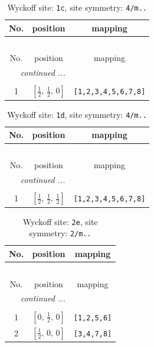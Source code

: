 \documentclass[fleqn,8pt]{jsarticle}
\begin{document}
\begin{longtable}{ccc}
\caption{Wyckoff site: {\tt 1c}, site symmetry: {\tt 4/m..}}
 \\
 \hline \hline
No. & position & mapping \\ \hline \endfirsthead

\multicolumn{2}{l}{\tablename\ \thetable{}} \\
 \hline \hline
No. & position & mapping \\ \hline \endhead

 \hline \hline
\multicolumn{2}{r}{\footnotesize\it continued ...} \\ \endfoot

 \hline \hline
\multicolumn{2}{r}{} \\ \endlastfoot

1 & $\left[ \frac{1}{2},\, \frac{1}{2},\, 0 \right]$ & {\tt [1,2,3,4,5,6,7,8]} \\
\end{longtable}
\renewcommand{\arraystretch}{1.2}
\begin{longtable}{ccc}
\caption{Wyckoff site: {\tt 1d}, site symmetry: {\tt 4/m..}}
 \\
 \hline \hline
No. & position & mapping \\ \hline \endfirsthead

\multicolumn{2}{l}{\tablename\ \thetable{}} \\
 \hline \hline
No. & position & mapping \\ \hline \endhead

 \hline \hline
\multicolumn{2}{r}{\footnotesize\it continued ...} \\ \endfoot

 \hline \hline
\multicolumn{2}{r}{} \\ \endlastfoot

1 & $\left[ \frac{1}{2},\, \frac{1}{2},\, \frac{1}{2} \right]$ & {\tt [1,2,3,4,5,6,7,8]} \\
\end{longtable}
\renewcommand{\arraystretch}{1.2}
\begin{longtable}{ccc}
\caption{Wyckoff site: {\tt 2e}, site symmetry: {\tt 2/m..}}
 \\
 \hline \hline
No. & position & mapping \\ \hline \endfirsthead

\multicolumn{2}{l}{\tablename\ \thetable{}} \\
 \hline \hline
No. & position & mapping \\ \hline \endhead

 \hline \hline
\multicolumn{2}{r}{\footnotesize\it continued ...} \\ \endfoot

 \hline \hline
\multicolumn{2}{r}{} \\ \endlastfoot

1 & $\left[ 0,\, \frac{1}{2},\, 0 \right]$ & {\tt [1,2,5,6]} \\ \hline
2 & $\left[ \frac{1}{2},\, 0,\, 0 \right]$ & {\tt [3,4,7,8]} \\
\end{longtable}
\end{document}
